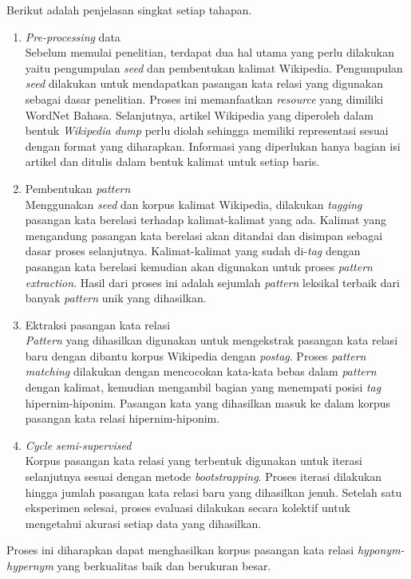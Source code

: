 \noindent Berikut adalah penjelasan singkat setiap tahapan.
\begin{enumerate}
  \item \textit{Pre-processing} data \\
  Sebelum memulai penelitian, terdapat dua hal utama yang perlu dilakukan yaitu pengumpulan \textit{seed} dan pembentukan kalimat Wikipedia. Pengumpulan \textit{seed} dilakukan untuk mendapatkan pasangan kata relasi yang digunakan sebagai dasar penelitian. Proses ini memanfaatkan \textit{resource} yang dimiliki WordNet Bahasa. Selanjutnya, artikel Wikipedia yang diperoleh dalam bentuk \textit{Wikipedia dump} perlu diolah sehingga memiliki representasi sesuai dengan format yang diharapkan. Informasi yang diperlukan hanya bagian isi artikel dan ditulis dalam bentuk kalimat untuk setiap baris.
  \item Pembentukan \textit{pattern} \\
  Menggunakan \textit{seed} dan korpus kalimat Wikipedia, dilakukan \textit{tagging} pasangan kata berelasi terhadap kalimat-kalimat yang ada. Kalimat yang mengandung pasangan kata berelasi akan ditandai dan disimpan sebagai dasar proses selanjutnya. Kalimat-kalimat yang sudah di-\textit{tag} dengan pasangan kata berelasi kemudian akan digunakan untuk proses \textit{pattern extraction}. Hasil dari proses ini adalah sejumlah \textit{pattern} leksikal terbaik dari banyak \textit{pattern} unik yang dihasilkan.
  \item Ektraksi pasangan kata relasi \\
  \textit{Pattern} yang dihasilkan digunakan untuk mengekstrak pasangan kata relasi baru dengan dibantu korpus Wikipedia dengan \textit{postag}. Proses \textit{pattern matching} dilakukan dengan mencocokan kata-kata bebas dalam \textit{pattern} dengan kalimat, kemudian mengambil bagian yang menempati posisi \textit{tag} hipernim-hiponim. Pasangan kata yang dihasilkan masuk ke dalam korpus pasangan kata relasi hipernim-hiponim.
  \item \textit{Cycle semi-supervised} \\ 
  Korpus pasangan kata relasi yang terbentuk digunakan untuk iterasi selanjutnya sesuai dengan metode \textit{bootstrapping}. Proses iterasi dilakukan hingga jumlah pasangan kata relasi baru yang dihasilkan jenuh. Setelah satu eksperimen selesai, proses evaluasi dilakukan secara kolektif untuk mengetahui akurasi setiap data yang dihasilkan.
\end{enumerate}

\noindent Proses ini diharapkan dapat menghasilkan korpus pasangan kata relasi \textit{hyponym-hypernym} yang berkualitas baik dan berukuran besar.


